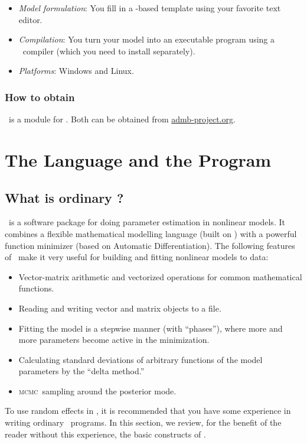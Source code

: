 \documentclass{admbmanual}
\newcommand{\scMCMC}{\textsc{mcmc}}
\begin{document}
\begin{itemize}
  \item\textit{Model formulation}: You fill in a \cplus-based template using
  your favorite text editor.

  \item \textit{Compilation}: You turn your model into an executable program
  using a \cplus\ compiler (which you need to install separately).

  \item\textit{Platforms}: Windows and Linux.
\end{itemize}

\subsection{How to obtain \scAR}

\scAR\ is a module for \scAB. Both can be obtained from
\href{admb-project.org}{admb-project.org}.

\chapter{The Language and the Program}

\section{What is ordinary \scAB?}

\scAB\ is a software package for doing parameter estimation in nonlinear models.
It combines a flexible mathematical modelling language (built on \cplus) with a
powerful function minimizer (based on Automatic Differentiation). The following
features of \scAB\ make it very useful for building and fitting nonlinear models
to data:

\begin{itemize}
  \item Vector-matrix arithmetic and vectorized operations for common
  mathematical functions.
  \item Reading and writing vector and matrix objects to a file.
  \item Fitting the model is a stepwise manner (with ``phases''), where more and
  more parameters become active in the minimization.
  \item Calculating standard deviations of arbitrary functions of the model
  parameters by the ``delta method.''
  \item \scMCMC\ sampling around the posterior mode.
\end{itemize}
To use random effects in \scAB, it is recommended that you have some experience
in writing ordinary \scAB\ programs. In this section, we review, for the benefit
of the reader without this experience, the basic constructs of \scAB.
\end{document}
